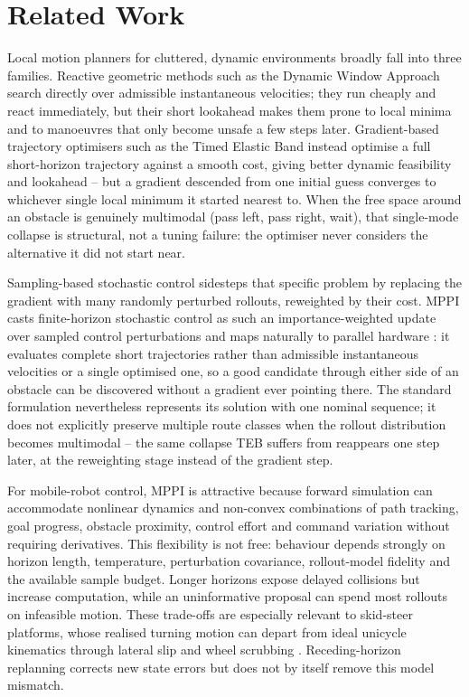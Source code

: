 \documentclass[journal]{IEEEtran}
\begin{document}
\section{Related Work}
Local motion planners for cluttered, dynamic environments broadly fall into
three families. Reactive geometric methods such as the Dynamic Window
Approach \cite{fox1997dwa} search directly over admissible instantaneous
velocities; they run cheaply and react immediately, but their short lookahead
makes them prone to local minima and to manoeuvres that only become unsafe a
few steps later. Gradient-based trajectory optimisers such as the Timed
Elastic Band \cite{roesmann2017teb} instead optimise a full short-horizon
trajectory against a smooth cost, giving better dynamic feasibility and
lookahead -- but a gradient descended from one initial guess converges to
whichever single local minimum it started nearest to. When the free space
around an obstacle is genuinely multimodal (pass left, pass right, wait), that
single-mode collapse is structural, not a tuning failure: the optimiser never
considers the alternative it did not start near.

Sampling-based stochastic control sidesteps that specific problem by
replacing the gradient with many randomly perturbed rollouts, reweighted by
their cost. MPPI casts finite-horizon stochastic control as such an
importance-weighted update over sampled control perturbations and maps
naturally to parallel hardware \cite{williams2017mppi,williams2018mppi}: it
evaluates complete short trajectories rather than admissible instantaneous
velocities or a single optimised one, so a good candidate through either side
of an obstacle can be discovered without a gradient ever pointing there. The
standard formulation nevertheless represents its solution with one nominal
sequence; it does not explicitly preserve multiple route classes when the
rollout distribution becomes multimodal -- the same collapse TEB suffers from
reappears one step later, at the reweighting stage instead of the gradient
step.

For mobile-robot control, MPPI is attractive because forward simulation can
accommodate nonlinear dynamics and non-convex combinations of path tracking,
goal progress, obstacle proximity, control effort and command variation without
requiring derivatives. This flexibility is not free: behaviour depends strongly
on horizon length, temperature, perturbation covariance, rollout-model fidelity
and the available sample budget. Longer horizons expose delayed collisions but
increase computation, while an uninformative proposal can spend most rollouts
on infeasible motion. These trade-offs are especially relevant to skid-steer
platforms, whose realised turning motion can depart from ideal unicycle
kinematics through lateral slip and wheel scrubbing
\cite{mandow2007skidsteer}. Receding-horizon replanning corrects new state
errors but does not by itself remove this model mismatch.
\end{document}
